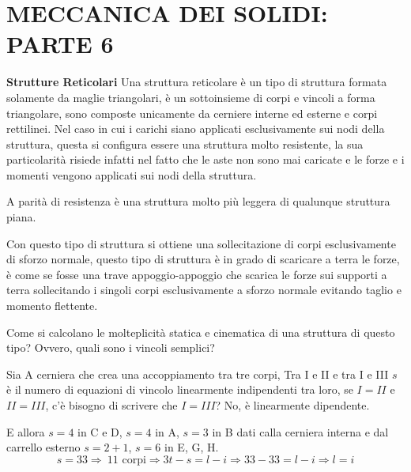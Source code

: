 \documentclass{article}
\begin{document}
	\section*{MECCANICA DEI SOLIDI: PARTE 6} %


\begin{adjustwidth}{2in}{} 
{\Large \textbf{Strutture Reticolari}} \mbox{} \newline
	Una struttura reticolare è un tipo di struttura formata solamente da maglie triangolari, è un sottoinsieme di corpi e vincoli a forma triangolare, sono composte unicamente da cerniere interne ed esterne e corpi rettilinei. Nel caso in cui i carichi siano applicati esclusivamente sui nodi della struttura, questa si configura essere una struttura molto resistente, la sua particolarità risiede infatti nel fatto che le aste non sono mai caricate e le forze e i momenti vengono applicati sui nodi della struttura. \newline
	
	A parità di resistenza è una struttura molto più leggera di qualunque struttura piana. \newline 
	
	Con questo tipo di struttura si ottiene una sollecitazione di corpi esclusivamente di sforzo normale, questo tipo di struttura è in grado di scaricare a terra le forze, è come se fosse una trave appoggio-appoggio che scarica le forze sui supporti a terra sollecitando i singoli corpi esclusivamente a sforzo normale evitando taglio e momento flettente. \newline 
	
	Come si calcolano le molteplicità statica e cinematica di una struttura di questo tipo? Ovvero, quali sono i vincoli semplici? 
	
	Sia A cerniera che crea una accoppiamento tra tre corpi, Tra I e II e tra I e III $s$ è il numero di equazioni di vincolo linearmente indipendenti tra loro, se $ I=II $ e $ II=III $, c'è bisogno di scrivere che $ I=III $? No, è linearmente dipendente. \newline 
	
	E allora $s=4$ in C e D, $s=4$ in A, $s=3$ in B dati calla cerniera interna e dal carrello esterno $s=2+1$, $s=6$ in E, G, H. 
	\[s=33\Rightarrow~\text{11 corpi} \Rightarrow 3t-s=l-i\Rightarrow 33-33 = l-i \Rightarrow l=i\]



\end{adjustwidth}
\end{document}
